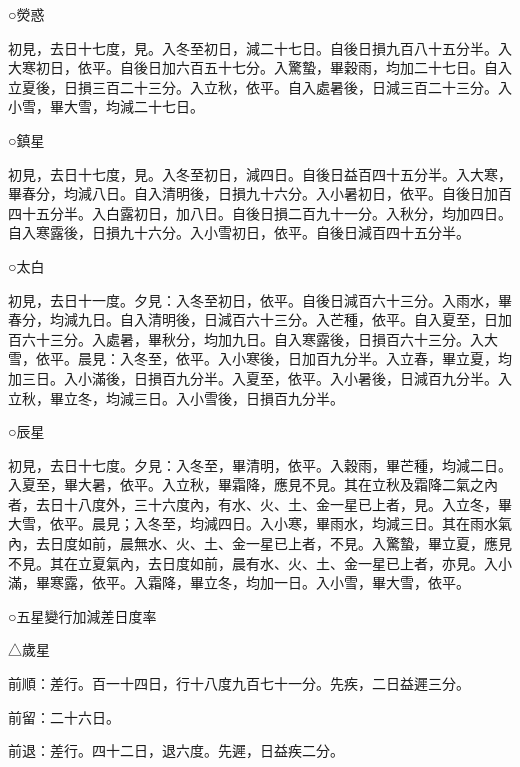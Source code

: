 \begin{pinyinscope}
 ○熒惑



 初見，去日十七度，見。入冬至初日，減二十七日。自後日損九百八十五分半。入大寒初日，依平。自後日加六百五十七分。入驚蟄，畢穀雨，均加二十七日。自入立夏後，日損三百二十三分。入立秋，依平。自入處暑後，日減三百二十三分。入小雪，畢大雪，均減二十七日。



 ○鎮星



 初見，去日十七度，見。入冬至初日，減四日。自後日益百四十五分半。入大寒，畢春分，均減八日。自入清明後，日損九十六分。入小暑初日，依平。自後日加百四十五分半。入白露初日，加八日。自後日損二百九十一分。入秋分，均加四日。自入寒露後，日損九十六分。入小雪初日，依平。自後日減百四十五分半。



 ○太白



 初見，去日十一度。夕見：入冬至初日，依平。自後日減百六十三分。入雨水，畢春分，均減九日。自入清明後，日減百六十三分。入芒種，依平。自入夏至，日加百六十三分。入處暑，畢秋分，均加九日。自入寒露後，日損百六十三分。入大雪，依平。晨見：入冬至，依平。入小寒後，日加百九分半。入立春，畢立夏，均加三日。入小滿後，日損百九分半。入夏至，依平。入小暑後，日減百九分半。入立秋，畢立冬，均減三日。入小雪後，日損百九分半。



 ○辰星



 初見，去日十七度。夕見：入冬至，畢清明，依平。入穀雨，畢芒種，均減二日。入夏至，畢大暑，依平。入立秋，畢霜降，應見不見。其在立秋及霜降二氣之內者，去日十八度外，三十六度內，有水、火、土、金一星已上者，見。入立冬，畢大雪，依平。晨見；入冬至，均減四日。入小寒，畢雨水，均減三日。其在雨水氣內，去日度如前，晨無水、火、土、金一星已上者，不見。入驚蟄，畢立夏，應見不見。其在立夏氣內，去日度如前，晨有水、火、土、金一星已上者，亦見。入小滿，畢寒露，依平。入霜降，畢立冬，均加一日。入小雪，畢大雪，依平。



 ○五星變行加減差日度率



 △歲星



 前順：差行。百一十四日，行十八度九百七十一分。先疾，二日益遲三分。



 前留：二十六日。



 前退：差行。四十二日，退六度。先遲，日益疾二分。




\end{pinyinscope}
